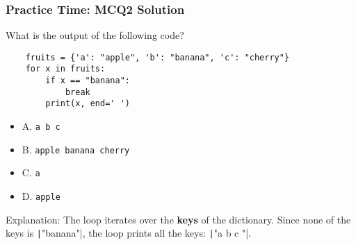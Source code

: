 \documentclass{beamer}
\newcommand{\python}[1]{\texttt|#1|}
\begin{document}
\begin{frame}[fragile]
    \frametitle{Practice Time: MCQ2 Solution}
    What is the output of the following code?

    \begin{verbatim}
    fruits = {'a': "apple", 'b': "banana", 'c': "cherry"}
    for x in fruits:
        if x == "banana":
            break
        print(x, end=' ')
    \end{verbatim}

    \begin{itemize}
        \item \alert{A. \texttt{a b c }}
        \item B. \texttt{apple banana cherry }
        \item C. \texttt{a }
        \item D. \texttt{apple }
    \end{itemize}

    Explanation:
    The loop iterates over the \textbf{keys} of the dictionary.
    Since none of the keys is \python{"banana"},
    the loop prints all the keys: \python{"a b c "}.
\end{frame}
\end{document}
